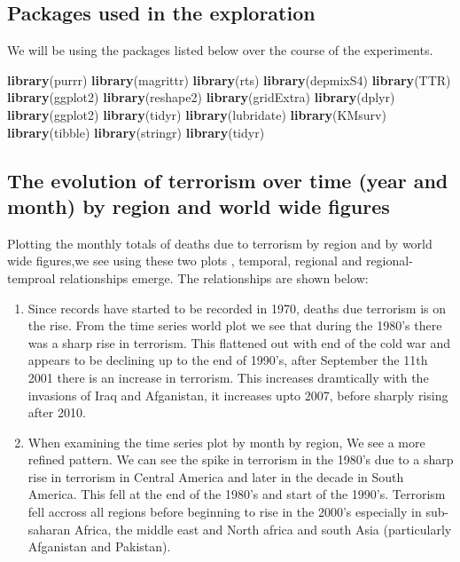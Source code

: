 \documentclass[]{article}
\title{}
\author{}
\date{}
\newenvironment{Shaded}{\begin{snugshade}}{\end{snugshade}}
\newcommand{\KeywordTok}[1]{\textcolor[rgb]{0.13,0.29,0.53}{\textbf{{#1}}}}
\newcommand{\NormalTok}[1]{{#1}}
\begin{document}
\subsection{Packages used in the
exploration}\label{packages-used-in-the-exploration}

We will be using the packages listed below over the course of the
experiments.

\begin{Shaded}
\begin{Highlighting}[]
\KeywordTok{library}\NormalTok{(purrr)}
\KeywordTok{library}\NormalTok{(magrittr)}
\KeywordTok{library}\NormalTok{(rts)}
\KeywordTok{library}\NormalTok{(depmixS4)}
\KeywordTok{library}\NormalTok{(TTR)}
\KeywordTok{library}\NormalTok{(ggplot2)}
\KeywordTok{library}\NormalTok{(reshape2)}
\KeywordTok{library}\NormalTok{(gridExtra)}
\KeywordTok{library}\NormalTok{(dplyr)}
\KeywordTok{library}\NormalTok{(ggplot2)}
\KeywordTok{library}\NormalTok{(tidyr)}
\KeywordTok{library}\NormalTok{(lubridate)}
\KeywordTok{library}\NormalTok{(KMsurv)}
\KeywordTok{library}\NormalTok{(tibble)}
\KeywordTok{library}\NormalTok{(stringr)}
\KeywordTok{library}\NormalTok{(tidyr)}
\end{Highlighting}
\end{Shaded}

\subsection{The evolution of terrorism over time (year and month) by
region and world wide
figures}\label{the-evolution-of-terrorism-over-time-year-and-month-by-region-and-world-wide-figures}

Plotting the monthly totals of deaths due to terrorism by region and by
world wide figures,we see using these two plots , temporal, regional and
regional-temproal relationships emerge. The relationships are shown
below:

\begin{enumerate}
\def\labelenumi{\arabic{enumi}.}
\item
  Since records have started to be recorded in 1970, deaths due
  terrorism is on the rise. From the time series world plot we see that
  during the 1980's there was a sharp rise in terrorism. This flattened
  out with end of the cold war and appears to be declining up to the end
  of 1990's, after September the 11th 2001 there is an increase in
  terrorism. This increases dramtically with the invasions of Iraq and
  Afganistan, it increases upto 2007, before sharply rising after 2010.
\item
  When examining the time series plot by month by region, We see a more
  refined pattern. We can see the spike in terrorism in the 1980's due
  to a sharp rise in terrorism in Central America and later in the
  decade in South America. This fell at the end of the 1980's and start
  of the 1990's. Terrorism fell accross all regions before beginning to
  rise in the 2000's especially in sub-saharan Africa, the middle east
  and North africa and south Asia (particularly Afganistan and
  Pakistan).
\end{enumerate}
\end{document}
